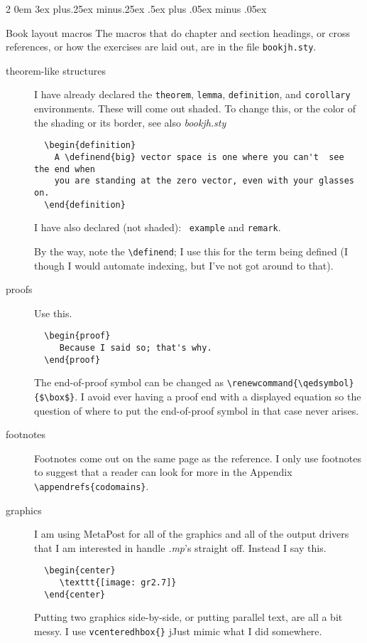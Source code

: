 \documentclass[titlepage]{article}
\makeatletter
\renewcommand{\subsection}{\@startsection{subsection}%
  {2}%
  {0em}%
  {3ex plus.25ex minus.25ex}%
  {.5ex plus .05ex minus .05ex}%
  {\bfseries\raggedright}}
\makeatother
\begin{document}
\subsection{Book layout macros}
The macros that do chapter and section headings, or cross references,
or how the exercises are laid out, are in the file 
\texttt{bookjh.sty}.


\begin{description}
  \item[theorem-like structures]
    I have already declared the
    \texttt{theorem}, \texttt{lemma}, 
    \texttt{definition}, and \texttt{corollary}
    environments.
    These will come out shaded.
    To change this, or the color of the shading or its border, see
    also \textit{bookjh.sty}
\begin{verbatim}
  \begin{definition}
    A \definend{big} vector space is one where you can't  see the end when 
    you are standing at the zero vector, even with your glasses on. 
  \end{definition}
\end{verbatim}
    I have also declared (not shaded):~ \texttt{example} and 
    \texttt{remark}.

    By the way, note the \verb!\definend!; I use this for the
    term being defined (I though I would automate indexing,
    but I've not got around to that).

  \item[proofs]
    Use this.
\begin{verbatim}
  \begin{proof}
     Because I said so; that's why.
  \end{proof}
\end{verbatim}
   The end-of-proof symbol can be changed as
   \verb!\renewcommand{\qedsymbol}{$\box$}!.
   I avoid ever having a proof end with a displayed equation
   so the question of
   where to put the end-of-proof symbol in that case never arises.

  \item[footnotes]
    Footnotes come out on the same page as the reference.
    I only use footnotes 
    to suggest that a reader can look for more in the Appendix
    \verb!\appendrefs{codomains}!.

  \item[graphics]
    I am using MetaPost for all of the graphics and all of the 
    output drivers that I am interested in handle \textit{.mp}'s straight off. 
    Instead I say this.
\begin{verbatim}
  \begin{center}
     \texttt{[image: gr2.7]}
  \end{center}
\end{verbatim}
   Putting two graphics side-by-side, or putting parallel text, are
   all a bit messy.
   I use \verb!vcenteredhbox{}!
   jJust mimic what I did somewhere.


\end{description}
\end{document}
